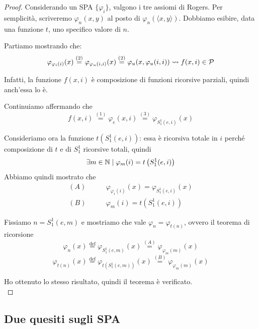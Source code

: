 \begin{proof}
	Considerando un SPA $\{\varphi_i\}$, valgono i tre assiomi di Rogers. Per semplicità, scriveremo $\varphi_n (x,y)$ al posto di $\varphi_n (\langle x,y \rangle)$. Dobbiamo esibire, data una funzione $t$, uno specifico valore di $n$.

	Partiamo mostrando che:
	$$ \varphi_{\varphi_i (i)} (x) \stackrel{(2)}{=} \varphi_{\varphi_u (i,i)} (x) \stackrel{(2)}{=} \varphi_u (x, \varphi_u (i,i)) \rightsquigarrow f(x,i) \in \mathcal{P} $$

	Infatti, la funzione $f(x,i)$ è composizione di funzioni ricorsive parziali, quindi anch'essa lo è.

	Continuiamo affermando che
	$$ f(x,i) \stackrel{(1)}{=} \varphi_e (x,i) \stackrel{(3)}{=} \varphi_{S_1^1 (e,i)} (x) $$

	Consideriamo ora la funzione $t\left(S_1^1 (e,i)\right)$: essa è ricorsiva totale in $i$ perché composizione di $t$ e di $S_1^1$ ricorsive totali, quindi
	$$ \exists m \in \mathbb{N} \mid \varphi_m (i) = t\left(S_1^1 (e,i)\right) $$
	Abbiamo quindi mostrato che
	\begin{align*}
		(A) \quad \quad & \varphi_{\varphi_i (i)} (x) = \varphi_{S_1^1 (e,i)} (x) \\
		(B) \quad \quad & \varphi_m (i) = t\left(S_1^1 (e,i) \right)
	\end{align*}

	Fissiamo $n = S_1^1 (e,m)$ e mostriamo che vale $\varphi_n = \varphi_{t(n)}$, ovvero il teorema di ricorsione
	$$ \varphi_n (x) \stackrel{\text{def}}{=} \varphi_{S_1^1 (e,m)} (x) \stackrel{(A)}{=} \varphi_{\varphi_m (m)} (x) $$
	$$ \varphi_{t(n)} (x) \stackrel{\text{def}}{=} \varphi_{t\left(S_1^1 (e,m)\right)} (x) \stackrel{(B)}{=} \varphi_{\varphi_m (m)} (x)$$

	Ho ottenuto lo stesso risultato, quindi il teorema è verificato.\\
\end{proof}

\subsection{Due quesiti sugli SPA}

